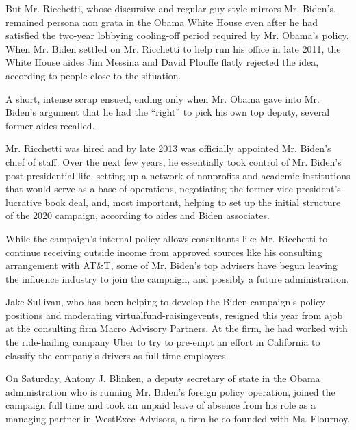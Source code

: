 But Mr. Ricchetti, whose discursive and regular-guy style mirrors Mr.
Biden's, remained persona non grata in the Obama White House even after
he had satisfied the two-year lobbying cooling-off period required by
Mr. Obama's policy. When Mr. Biden settled on Mr. Ricchetti to help run
his office in late 2011, the White House aides Jim Messina and David
Plouffe flatly rejected the idea, according to people close to the
situation.

A short, intense scrap ensued, ending only when Mr. Obama gave into Mr.
Biden's argument that he had the ``right'' to pick his own top deputy,
several former aides recalled.

Mr. Ricchetti was hired and by late 2013 was officially appointed Mr.
Biden's chief of staff. Over the next few years, he essentially took
control of Mr. Biden's post-presidential life, setting up a network of
nonprofits and academic institutions that would serve as a base of
operations, negotiating the former vice president's lucrative book deal,
and, most important, helping to set up the initial structure of the 2020
campaign, according to aides and Biden associates.

While the campaign's internal policy allows consultants like Mr.
Ricchetti to continue receiving outside income from approved sources
like his consulting arrangement with AT\&T, some of Mr. Biden's top
advisers have begun leaving the influence industry to join the campaign,
and possibly a future administration.

Jake Sullivan, who has been helping to develop the Biden campaign's
policy positions and moderating
virtual\href{https://secure.joebiden.com/onlineactions/uss1zC2ZQEyvAQGK-wIhVw2?attr=100631128\&fbclid=IwAR0g9AVpZyY6_2T5hARYM4AKJ9crM1ftzQ7e_ebEB1KxpYvAOG6-d6Huwcc}{}fund-raising\href{https://secure.joebiden.com/onlineactions/rQ8rSBiMhU-jvj_wE2bO0A2?attr=100631128\&fbclid=IwAR2BvgVknJAr9orxEvwJ24qLH_pl1oqZ4itbFMSZj2hSuDZNxO-zJ2Ce-MM}{events},
resigned this year from
a\href{https://prospect.org/world/biden-adviser-jake-sullivan-gig-with-uber/}{job
at the consulting firm Macro Advisory Partners}. At the firm, he had
worked with the ride-hailing company Uber to try to pre-empt an effort
in California to classify the company's drivers as full-time employees.

On Saturday, Antony J. Blinken, a deputy secretary of state in the Obama
administration who is running Mr. Biden's foreign policy operation,
joined the campaign full time and took an unpaid leave of absence from
his role as a managing partner in WestExec Advisors, a firm he
co-founded with Ms. Flournoy.

